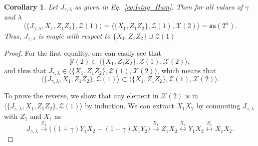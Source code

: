 \documentclass[12pt, a4-paper]{amsart}
\newcommand{\cX}{\mathcal{X}}
\newcommand{\cY}{\mathcal{Y}}
\newcommand{\cZ}{\mathcal{Z}}
\numberwithin{equation}{section}
\newtheorem{cor}[lemma]{Corollary}
\begin{document}
\begin{cor}\label{Ising}
    Let $J_{\gamma, \lambda}$ as given in Eq.~\eqref{eq:Ising_Ham}. Then for all values of $\gamma$ and $\lambda$
    \begin{equation}
        \langle \{J_{\gamma, \lambda}, X_1, Z_1 Z_2 \}, \cZ(1) \rangle = \langle \{X_1, Z_1 Z_2 \}, \cZ(1), \cX(2) \rangle = \mathfrak{su}(2^n).
    \end{equation}
    Thus, $J_{\gamma, \lambda}$ is magic with respect to $\{X_1, Z_1Z_2\}\cup \cZ(1)$
\end{cor}
\begin{proof}
    For the first equality, one can easily see that 
    \begin{equation}
        \cY(2) \subset \langle \{X_1, Z_1 Z_2 \}, \cZ(1), \cX(2) \rangle,
    \end{equation}
    and thus that $J_{\gamma, \lambda} \in \langle \{X_1, Z_1 Z_2 \}, \cZ(1), \cX(2) \rangle$, which means that
    \begin{equation}\label{eq:subset1}
        \langle \{J_{\gamma, \lambda}, X_1, Z_1 Z_2 \}, \cZ(1) \rangle \subset \langle \{X_1, Z_1 Z_2 \}, \cZ(1), \cX(2) \rangle.
    \end{equation}

    To prove the reverse, we show that any element in $\cX(2)$ is in $\langle \{J_{\gamma, \lambda}, X_1, Z_1 Z_2 \}, \cZ(1) \rangle$ by induction. We can extract $X_1 X_2$ by commuting $J_{\gamma, \lambda}$ with $Z_1$ and $X_1$ as
    \begin{equation}
        J_{\gamma, \lambda} \stackrel{Z_1}{\longrightarrow} \big( (1+\gamma) Y_1 X_{2} - (1-\gamma) X_1 Y_{2}\big) \stackrel{X_1}{\longrightarrow} Z_1 X_{2} \stackrel{X_1}{\longleftrightarrow} Y_1X_2 \stackrel{Z_1}{\longleftrightarrow} X_1 X_2.
    \end{equation}
    

\end{proof}
\end{document}
